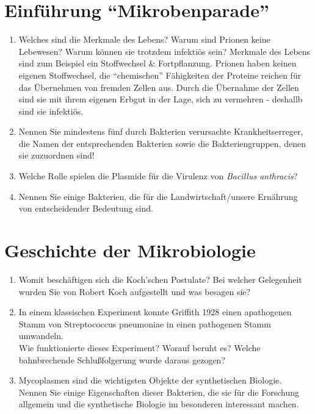 
\section{Einführung ``Mikrobenparade''}
	\begin{enumerate}
		\item Welches sind die Merkmale des Lebens? Warum sind Prionen keine Lebewesen? Warum können sie trotzdem infektiös sein? \hfill \vspace{4mm}
		Merkmale des Lebens sind zum Beispiel ein Stoffwechsel \& Fortpflanzung.
		Prionen haben keinen eigenen Stoffwechsel,
		die ``chemischen'' Fähigkeiten der Proteine reichen für das Übernehmen von fremden Zellen aus.
		Durch die Übernahme der Zellen sind sie mit ihrem eigenen Erbgut in der Lage,
		sich zu vermehren - deshallb sind sie infektiös.
		\item Nennen Sie mindestens fünf durch Bakterien verursachte Krankheitserreger, die Namen der entsprechenden Bakterien sowie die Bakteriengruppen, denen sie zuzuordnen sind! \hfill \vspace{4mm} 
		\item Welche Rolle spielen die Plasmide für die Virulenz von \emph{Bacillus anthracis}?  \hfill \vspace{4mm}
		\item Nennen Sie einige Bakterien, die für die Landwirtschaft/unsere Ernährung von entscheidender Bedeutung sind. \hfill \vspace{4mm}
	\end{enumerate}


\section{Geschichte der Mikrobiologie}
	\begin{enumerate}
		\item Womit beschäftigen sich die Koch’schen Postulate? Bei welcher Gelegenheit wurden Sie von Robert Koch aufgestellt und was besagen sie? \hfill \vspace{4mm}
		\item In einem klassischen Experiment konnte Griffith 1928 einen apathogenen Stamm von Streptococcus pneumoniae in einen pathogenen Stamm umwandeln.\\
			Wie funktionierte dieses Experiment? Worauf beruht es? Welche bahnbrechende Schlußfolgerung wurde daraus gezogen? \hfill \vspace{4mm}
		\item Mycoplasmen sind die wichtigsten Objekte der synthetischen Biologie. Nennen Sie einige Eigenschaften dieser Bakterien, die sie für die Forschung allgemein und die synthetische Biologie im besonderen interessant machen. \hfill \vspace{4mm}
	\end{enumerate}

